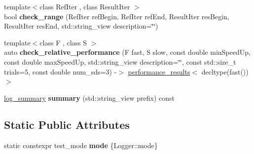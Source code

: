 \begin{DoxyCompactItemize}
\item 
\mbox{\label{classsequoia_1_1unit__testing_1_1checker_af69372e391ede8e42ffd6a24926af00c}} 
{\footnotesize template$<$class Ref\+Iter , class Result\+Iter $>$ }\\bool {\bfseries check\+\_\+range} (Ref\+Iter ref\+Begin, Ref\+Iter ref\+End, Result\+Iter res\+Begin, Result\+Iter res\+End, std\+::string\+\_\+view description=\char`\"{}\char`\"{})
\item 
\mbox{\label{classsequoia_1_1unit__testing_1_1checker_ab5babe8227e574cf07c7c614aeb527b6}} 
{\footnotesize template$<$class F , class S $>$ }\\auto {\bfseries check\+\_\+relative\+\_\+performance} (F fast, S slow, const double min\+Speed\+Up, const double max\+Speed\+Up, std\+::string\+\_\+view description=\char`\"{}\char`\"{}, const std\+::size\+\_\+t trials=5, const double num\+\_\+sds=3) -\/$>$ \mbox{\hyperlink{structsequoia_1_1unit__testing_1_1performance__results}{performance\+\_\+results}}$<$ decltype(fast())$>$
\item 
\mbox{\label{classsequoia_1_1unit__testing_1_1checker_a285be4058e4a96fa9482f90f92eea2f1}} 
\mbox{\hyperlink{classsequoia_1_1unit__testing_1_1log__summary}{log\+\_\+summary}} {\bfseries summary} (std\+::string\+\_\+view prefix) const
\end{DoxyCompactItemize}
\subsection*{Static Public Attributes}
\begin{DoxyCompactItemize}
\item 
\mbox{\label{classsequoia_1_1unit__testing_1_1checker_a4a61ac475beafa1e3535494b160dc25c}} 
static constexpr test\+\_\+mode {\bfseries mode} \{Logger\+::mode\}
\end{DoxyCompactItemize}
